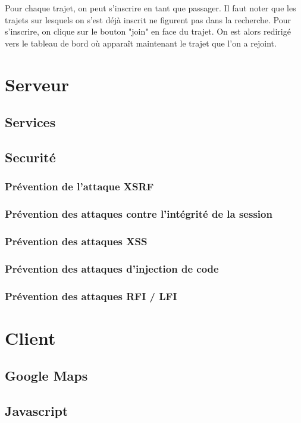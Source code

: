 \documentclass[a4paper]{article}
\begin{document}
Pour chaque trajet, on peut s'inscrire en tant que passager. Il faut noter que les trajets sur lesquels on s'est déjà inscrit ne figurent
pas dans la recherche. Pour s'inscrire, on clique sur le bouton "join" en face du trajet. On est alors redirigé vers le tableau de bord
où apparaît maintenant le trajet que l'on a rejoint.

\section{Serveur}

	\subsection{Services}
	\subsection{Securité}
 		\subsubsection{Prévention de l'attaque XSRF}
 		\subsubsection{Prévention des attaques contre l'intégrité de la session}
 		\subsubsection{Prévention des attaques XSS}
		\subsubsection{Prévention des attaques d'injection de code}
		\subsubsection{Prévention des attaques RFI / LFI}
 		
\section{Client}

	\subsection{Google Maps}
	\subsection{Javascript} 
\end{document}
